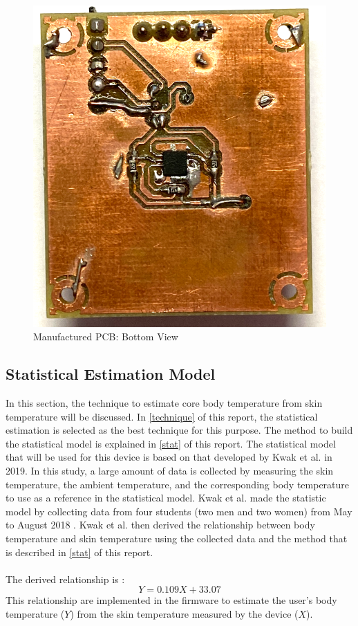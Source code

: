 \begin{figure}[H]
	\centering
	\includegraphics[scale=0.3]{img/MPCB-Bottom.PNG}
	\caption{Manufactured PCB: Bottom View}
	\label{MPCB-Bottom}
\end{figure}

\subsection{Statistical Estimation Model}\label{estm}
In this section, the technique to estimate core body temperature from skin temperature will be discussed. In \autoref{technique} of this report, the statistical estimation is selected as the best technique for this purpose. The method to build the statistical model is explained in \autoref{stat} of this report. The statistical model that will be used for this device is based on that developed by Kwak et al. \cite{Kwak2019} in 2019. In this study, a large amount of data is collected by measuring the skin temperature, the ambient temperature, and the corresponding body temperature to use as a reference in the statistical model. Kwak et al. made the statistic model by collecting data from four students (two men and two women) from May to August 2018 \cite{Kwak2019}. Kwak et al. then derived the relationship between body temperature and skin temperature using the collected data and the method that is described in \autoref{stat} of this report. 
\\
\\
The derived relationship is \cite{Kwak2019}:
\begin{equation}
    Y = 0.109X + 33.07
    \label{estimate}
\end{equation}
\noindent
This relationship are implemented in the firmware to estimate the user's body temperature ($ Y $) from the skin temperature measured by the device ($ X $).

